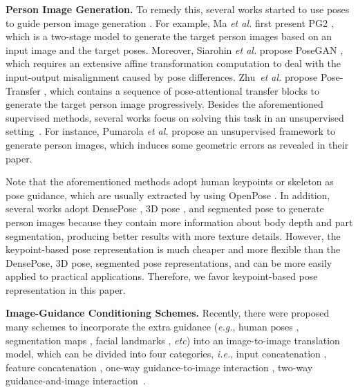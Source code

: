 \documentclass[runningheads]{llncs}
\begin{document}
\noindent \textbf{Person Image Generation.} To remedy this, several works started to use poses to guide person image generation \cite{ma2017pose,ma2018disentangled,siarohin2018deformable,esser2018variational,tang2019cycle,zhu2019progressive}.
For example, Ma \emph{et al.} first present PG2 \cite{ma2017pose}, which is a two-stage model to generate the target person images based on an input image and the target poses.
Moreover, Siarohin \emph{et al.} propose PoseGAN \cite{siarohin2018deformable}, which requires an extensive affine transformation computation to deal with the input-output misalignment caused by pose differences.
Zhu~\emph{et al.} propose Pose-Transfer \cite{zhu2019progressive}, which contains a sequence of pose-attentional transfer blocks to generate the target person image progressively. 
Besides the aforementioned supervised methods, several works focus on solving this task in an unsupervised setting~\cite{pumarola2018unsupervised,song2019unsupervised}. 
For instance, Pumarola \emph{et al.} propose an unsupervised framework \cite{pumarola2018unsupervised} to generate person images, which induces some geometric errors as revealed in their paper.

Note that the aforementioned methods adopt human keypoints or skeleton as pose guidance, which are usually extracted by using OpenPose \cite{cao2017realtime}.
In addition, several works adopt DensePose \cite{neverova2018dense}, 3D pose \cite{li2019dense}, and segmented pose \cite{dong2018soft} to generate person images because they contain more information about body depth and part segmentation, producing better results with more texture details. 
However, the keypoint-based pose representation is much cheaper and more flexible than the DensePose, 3D pose, segmented pose representations, and can be more easily applied to practical applications.
Therefore, we favor keypoint-based pose representation in this paper.

\noindent \textbf{Image-Guidance Conditioning Schemes.}
Recently, there were proposed many schemes to incorporate the extra guidance (\emph{e.g.}, human poses \cite{ma2017pose,zhu2019progressive}, segmentation maps \cite{park2019semantic,tang2019multi,tang2020local}, facial landmarks \cite{tang2019cycle,zakharov2019few}, \emph{etc}) into an image-to-image translation model, which can be divided into four categories, 
\emph{i.e.}, input concatenation \cite{tang2019cycle,xian2018texturegan,zhang2017real}, feature concatenation \cite{ma2017pose,ma2018disentangled,esser2018variational,li2019dense,lai2018learning,li2019joint}, one-way guidance-to-image interaction \cite{siarohin2018deformable,park2019semantic,huang2017arbitrary,perez2018film}, two-way guidance-and-image interaction~\cite{zhu2019progressive,albahar2019guided,chi2019two}.
\end{document}
